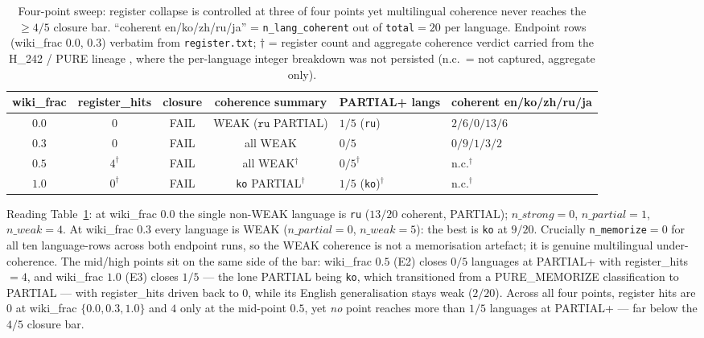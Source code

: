 \documentclass[11pt,a4paper]{article}
\begin{document}
\begin{table}[h]
\centering
\caption{Four-point sweep: register collapse is controlled at three of
four points yet multilingual coherence never reaches the $\geq 4/5$
closure bar. ``coherent en/ko/zh/ru/ja'' = \texttt{n\_lang\_coherent} out
of \texttt{total}$=20$ per language. Endpoint rows (wiki\_frac $0.0$,
$0.3$) verbatim from \texttt{register.txt}; $\dagger$ = register count and
aggregate coherence verdict carried from the H\_242 / PURE lineage
\citep{anima2026h242}, where the per-language integer breakdown was not
persisted (n.c.\ = not captured, aggregate only).}
\label{tab:fourpoint}
\small
\begin{tabular}{@{}ccccll@{}}
\toprule
wiki\_frac & register\_hits & closure & coherence summary & PARTIAL+ langs & coherent en/ko/zh/ru/ja \\
\midrule
$0.0$ & $0$        & FAIL & WEAK ($\texttt{ru}$ PARTIAL) & $1/5$ (\texttt{ru})  & $2/6/0/13/6$ \\
$0.3$ & $0$        & FAIL & all WEAK                      & $0/5$                & $0/9/1/3/2$ \\
$0.5$ & $4^{\dagger}$ & FAIL & all WEAK$^{\dagger}$       & $0/5^{\dagger}$      & n.c.$^{\dagger}$ \\
$1.0$ & $0^{\dagger}$ & FAIL & \texttt{ko} PARTIAL$^{\dagger}$ & $1/5$ (\texttt{ko})$^{\dagger}$ & n.c.$^{\dagger}$ \\
\bottomrule
\end{tabular}
\end{table}

\noindent Reading Table~\ref{tab:fourpoint}: at wiki\_frac $0.0$ the
single non-WEAK language is \texttt{ru} ($13/20$ coherent, PARTIAL);
$n\_strong=0$, $n\_partial=1$, $n\_weak=4$. At wiki\_frac $0.3$ every
language is WEAK ($n\_partial=0$, $n\_weak=5$): the best is \texttt{ko} at
$9/20$. Crucially \verb|n_memorize|$=0$ for all ten language-rows across
both endpoint runs, so the WEAK coherence is not a memorisation artefact;
it is genuine multilingual under-coherence. The mid/high points sit on the
same side of the bar: wiki\_frac $0.5$ (E2) closes $0/5$ languages at
PARTIAL+ with register\_hits $=4$, and wiki\_frac $1.0$ (E3) closes
$1/5$ --- the lone PARTIAL being \texttt{ko}, which transitioned from a
PURE\_MEMORIZE classification to PARTIAL --- with register\_hits driven
back to $0$, while its English generalisation stays weak ($2/20$). Across
all four points, register hits are $0$ at wiki\_frac $\{0.0,0.3,1.0\}$ and
$4$ only at the mid-point $0.5$, yet \emph{no} point reaches more than
$1/5$ languages at PARTIAL+ --- far below the $4/5$ closure bar.
\end{document}

